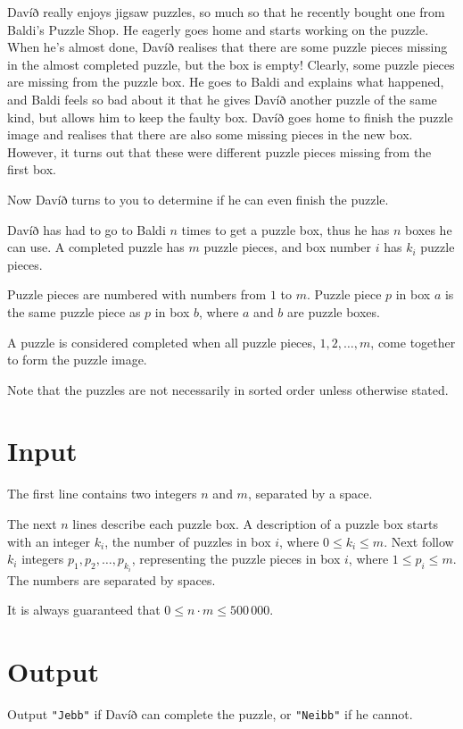 
Davíð really enjoys jigsaw puzzles, so much so that he recently bought one from Baldi's Puzzle Shop.
He eagerly goes home and starts working on the puzzle. When he's almost done, Davíð realises that there are some puzzle pieces missing in the almost completed puzzle,
but the box is empty! Clearly, some puzzle pieces are missing from the puzzle box. He goes to Baldi and explains what happened,
and Baldi feels so bad about it that he gives Davíð another puzzle of the same kind, but allows him to keep the faulty box.
Davíð goes home to finish the puzzle image and realises that there are also some missing pieces in the new box. However, it turns out that these were different puzzle pieces missing from the first box.

Now Davíð turns to you to determine if he can even finish the puzzle.

Davíð has had to go to Baldi $n$ times to get a puzzle box, thus he has $n$ boxes he can use.
A completed puzzle has $m$ puzzle pieces, and box number $i$ has $k_i$ puzzle pieces.

Puzzle pieces are numbered with numbers from $1$ to $m$. Puzzle piece $p$ in box $a$ is the same puzzle piece as $p$ in box $b$, where $a$ and $b$ are puzzle boxes.

A puzzle is considered completed when all puzzle pieces, $1, 2, \ldots, m$, come together to form the puzzle image.

Note that the puzzles are not necessarily in sorted order unless otherwise stated.

\section*{Input}
The first line contains two integers $n$ and $m$, separated by a space.

The next $n$ lines describe each puzzle box.
A description of a puzzle box starts with an integer $k_i$, the number of puzzles in box $i$, where $0 \leq k_i \leq m$.
Next follow $k_i$ integers $p_1, p_2, \ldots, p_{k_i}$, representing the puzzle pieces in box $i$, where $1 \leq p_i \leq m$.
The numbers are separated by spaces.

It is always guaranteed that $0 \leq n \cdot m \leq 500\,000$.

\section*{Output}
Output \texttt{"Jebb"} if Davíð can complete the puzzle, or \texttt{"Neibb"} if he cannot.

